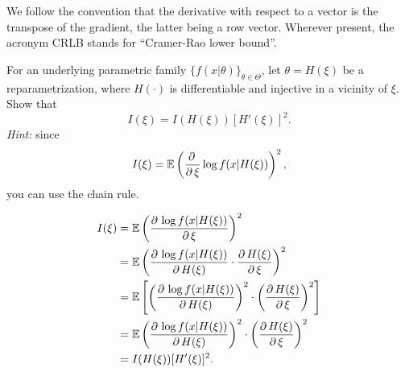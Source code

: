 \chapter{}

 We follow the convention that the derivative with respect to a vector is the transpose of the gradient, the latter being a row vector. Wherever present, the acronym CRLB stands for “Cramer-Rao lower bound”. 

\begin{ex} \label{ex:5.1}
    For an underlying parametric family $\{f(x|\theta)\}_{\theta\in\Theta}$, let $\theta=H(\xi)$ be a reparametrization, where $H(\cdot)$ is differentiable and injective in a vicinity of $\xi$. Show that 
    \[
        I(\xi)=I(H(\xi))[H'(\xi)]^2. 
    \]
    \emph{Hint:} since\[
        I(\xi)=\mathbb{E}\left(\frac{\partial\,}{\partial\, \xi}\log f(x|H(\xi))\right)^2, 
    \]
    you can use the chain rule. 
\end{ex}

\begin{solution}
    \[
        \begin{aligned}
            I(\xi)&=\mathbb{E}\left(\frac{\partial\, \log f(x|H(\xi))}{\partial\, \xi}\right)^2\\
            &=\mathbb{E}\left(\frac{\partial\, \log f(x|H(\xi))}{\partial\, H(\xi)}\cdot\frac{\partial\, H(\xi)}{\partial\, \xi}\right)^2\\
            &=\mathbb{E}\left[\left(\frac{\partial\, \log f(x|H(\xi))}{\partial\, H(\xi)}\right)^2\cdot\left(\frac{\partial\, H(\xi)}{\partial\, \xi}\right)^2\right]\\
            &=\mathbb{E}\left(\frac{\partial\, \log f(x|H(\xi))}{\partial\, H(\xi)}\right)^2\cdot\left(\frac{\partial\, H(\xi)}{\partial\, \xi}\right)^2\\
            &=I(H(\xi))[H'(\xi)]^2. 
        \end{aligned}
    \]
\end{solution}

